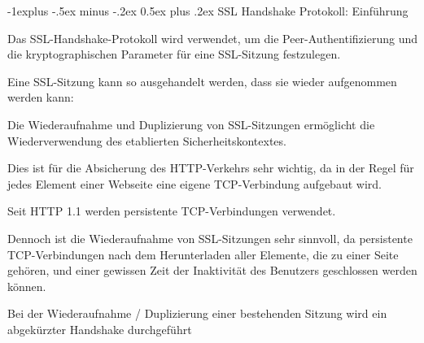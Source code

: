 \documentclass[a4paper]{article}
\makeatletter
\renewcommand{\subsection}{\@startsection{subsection}{2}{0mm}%
 {-1explus -.5ex minus -.2ex}%
 {0.5ex plus .2ex}%
 {\normalfont\normalsize\bfseries}}
\makeatother
\begin{document}
\begin{multicols}{3}
\begin{itemize*}
            \subsection{SSL Handshake Protokoll:
                  Einführung}
            \begin{itemize*}
                  \item Das SSL-Handshake-Protokoll wird verwendet, um die
                  Peer-Authentifizierung und die kryptographischen Parameter für eine
                  SSL-Sitzung festzulegen.
                  \item Eine SSL-Sitzung kann so ausgehandelt werden, dass sie wieder
                  aufgenommen werden kann:
                  \begin{itemize*}
                        \item Die Wiederaufnahme und Duplizierung von SSL-Sitzungen ermöglicht die Wiederverwendung des etablierten Sicherheitskontextes.
                        \item Dies ist für die Absicherung des HTTP-Verkehrs sehr wichtig, da in der Regel für jedes Element einer Webseite eine eigene TCP-Verbindung aufgebaut wird.
                        \begin{itemize*} \item Seit HTTP 1.1 werden persistente TCP-Verbindungen verwendet. \item Dennoch ist die Wiederaufnahme von SSL-Sitzungen sehr sinnvoll, da persistente TCP-Verbindungen nach dem Herunterladen aller Elemente, die zu einer Seite gehören, und einer gewissen Zeit der Inaktivität des Benutzers geschlossen werden können. \end{itemize*}
                        \item Bei der Wiederaufnahme / Duplizierung einer bestehenden Sitzung wird ein abgekürzter Handshake durchgeführt
                  \end{itemize*}
            \end{itemize*}


\end{itemize*}
\end{multicols}
\end{document}
